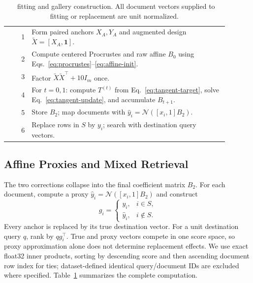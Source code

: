 \begin{table}[t]
\caption{\method\ fitting and gallery construction. All document vectors supplied
to fitting or replacement are unit normalized.}
\label{tab:algorithm}
\centering
\begin{minipage}{0.97\linewidth}
\small
\begin{tabular}{@{}r p{0.89\linewidth}@{}}
\toprule
1 & Form paired anchors $X_A,Y_A$ and augmented design
    $\widetilde{X}=[X_A,\mathbf{1}]$.\\
2 & Compute centered Procrustes and raw affine $B_0$
    using Eqs.~\eqref{eq:procrustes}--\eqref{eq:affine-init}.\\
3 & Factor $\widetilde{X}\widetilde{X}^{\top}+10I_m$ once.\\
4 & For $t=0,1$: compute $T^{(t)}$ from Eq.~\eqref{eq:tangent-target},
    solve Eq.~\eqref{eq:tangent-update}, and accumulate $B_{t+1}$.\\
5 & Store $B_2$; map documents with
    $\widehat{y}_i=\mathcal{N}([x_i,1]B_2)$.\\
6 & Replace rows in $S$ by $y_i$; search with destination query vectors.\\
\bottomrule
\end{tabular}
\end{minipage}
\end{table}

\subsection{Affine Proxies and Mixed Retrieval}
\label{sec:mixed-gallery}

The two corrections collapse into the final coefficient matrix $B_2$.
For each document, compute a proxy
$\widehat{y}_i=\mathcal{N}([x_i,1]B_2)$ and construct
\begin{equation}
 g_i=\begin{cases}
 y_i,&i\in S,\\
 \widehat{y}_i,&i\notin S.
 \end{cases}
 \label{eq:mixed-gallery}
\end{equation}
Every anchor is replaced by its true destination vector. For a unit
destination query $q$, rank by $qg_i^\top$. True and proxy vectors compete in
one score space, so proxy approximation alone does not determine replacement
effects. We use exact
float32 inner products, sorting by descending score and then ascending document
row index for ties; dataset-defined identical query/document IDs are excluded
where specified. Table~\ref{tab:algorithm} summarizes the complete computation.

